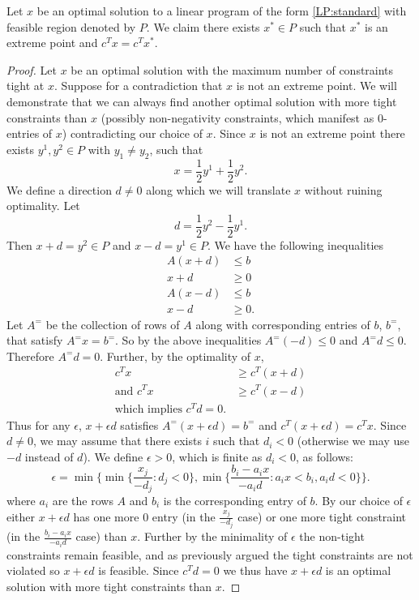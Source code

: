 \begin{lemma} Let $x$ be an optimal solution to a linear program of the form \ref{LP:standard} with feasible region denoted by $P$. We claim there exists $x^* \in P$ such that $x^*$ is an extreme point and $c^Tx = c^Tx^*$.
\end{lemma}
\begin{proof}
Let $x$ be an optimal solution with the maximum number of constraints tight at $x$. Suppose for a contradiction that $x$ is not an extreme point. We will demonstrate that we can always find another optimal solution with more tight constraints than $x$ (possibly non-negativity constraints, which manifest as $0$-entries of $x$) contradicting our choice of $x$. Since $x$ is not an extreme point there exists $y^1, y^2 \in P$ with $y_1 \neq y_2$, such that  $$x = \frac{1}{2} y^1 + \frac{1}{2}y^2.$$
We define a direction $d\neq 0$ along which we will translate $x$ without ruining optimality. Let
$$ d = \frac{1}{2}y^2 - \frac{1}{2} y^1.$$
Then $x + d = y^2 \in P$ and $x - d = y^1 \in P$. We have the following inequalities
\begin{align*} A(x+d) &\leq b \\ x+d &\geq 0 \\
A(x-d) &\leq b \\ x-d &\geq 0 .\end{align*}
Let $A^=$ be the collection of rows of $A$ along with corresponding entries of $b$, $b^=$, that satisfy $A^= x = b^=$. So by the above inequalities $A^=(-d) \leq 0$ and $A^=d \leq 0$. Therefore $A^=d = 0$. Further, by the optimality of $x$,
\begin{align*}
c^Tx &\geq c^T(x+d) \\
\text{and } c^Tx &\geq c^T(x-d) \\
\text{which implies } c^Td = 0.
\end{align*}
Thus for any $\epsilon$, $x+\epsilon d$ satisfies $A^=(x+\epsilon d) = b^=$ and $c^T(x+\epsilon d) = c^Tx$. Since $d \neq 0$, we may assume that there exists $i$ such that $d_i < 0$ (otherwise we may use $-d$ instead of $d$). We define $\epsilon > 0$, which is finite as $d_i < 0$, as follows:
$$ \epsilon = \min\{ \min\{\frac{x_j}{-d_j}: d_j < 0\}, \min \{\frac{b_i - a_i x }{-a_id}: a_i x < b_i, a_i d < 0 \}\}.$$
where $a_i$ are the rows $A$ and $b_i$ is the corresponding entry of $b$. By our choice of $\epsilon$ either $x+\epsilon d$ has one more $0$ entry (in the $\frac{x_j}{-d_j}$ case) or one more tight constraint (in the $\frac{b_i-a_i x}{-a_id}$ case) than $x$. Further by the minimality of $\epsilon$ the non-tight constraints remain feasible, and as previously argued the tight constraints are not violated so $x + \epsilon d$ is feasible. Since $c^Td = 0$ we thus have $x + \epsilon d$ is an optimal solution with more tight constraints than $x$.
\end{proof}
